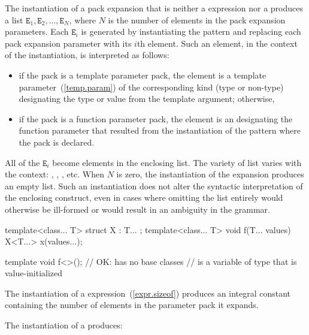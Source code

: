 \exitexample

\pnum
The instantiation of a pack expansion
that is neither a  expression
nor a 
produces a
list
$\mathtt{E}_1, \mathtt{E}_2, ..., \mathtt{E}_N$,
where
$N$ is the number of elements in the pack expansion parameters. Each
$\mathtt{E}_i$ is generated by instantiating the pattern and
replacing each pack expansion parameter with its $i$th element.
Such an element, in the context of the instantiation, is interpreted as
follows:

\begin{itemize}
\item
if the pack is a template parameter pack, the element is a template
parameter~(\ref{temp.param}) of the corresponding kind (type or
non-type) designating the type or value from the template
argument; otherwise,

\item
if the pack is a function parameter pack, the element is an
designating the function parameter that resulted from
the instantiation of the pattern where the pack is declared.
\end{itemize}

All of the $\mathtt{E}_i$ become elements in the enclosing list.
\enternote The variety of list varies with the context:
,
,
, etc.\exitnote
When $N$ is zero, the instantiation of the expansion produces an empty list.
Such an instantiation does not alter the syntactic interpretation of the
enclosing construct, even in cases where omitting the list entirely would
otherwise be ill-formed or would result in an ambiguity in the grammar.
\enterexample
\begin{codeblock}
template<class... T> struct X : T... { };
template<class... T> void f(T... values) {
  X<T...> x(values...);
}

template void f<>();  // OK:  has no base classes
                      //  is a variable of type  that is value-initialized
\end{codeblock}
\exitexample

\pnum
The instantiation of a  expression~(\ref{expr.sizeof}) produces
an integral constant containing the number of elements in the parameter pack
it expands.

\pnum
The instantiation of a  produces:

